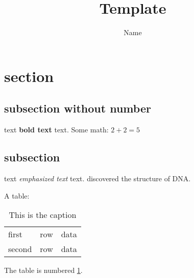 \documentclass[11pt]{article}
\title{Template}
\author{Name}
\begin{document}
\maketitle

\section{section}
\subsection*{subsection without number}
text \textbf{bold text} text. Some math: $2+2=5$
\subsection{subsection}
text \emph{emphasized text} text. \cite{WC:1953}
discovered the structure of DNA.

A table:
\begin{table}[!th]
\begin{tabular}{|l|c|r|}
\hline
first & row & data \\
second & row & data \\ 
\hline
\end{tabular}
\caption{This is the caption}
\label{ex:table}
\end{table}

The table is numbered \ref{ex:table}.
\end{document}
